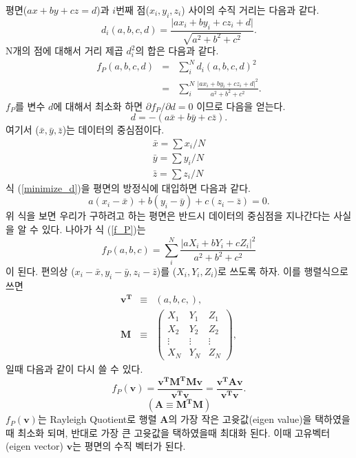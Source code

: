 \documentclass[a4paper,14pt]{oblivoir}
\begin{document}
평면($ax+by+cz=d$)과 $i$번째 점($x_i, y_i, z_i$)  사이의 수직 거리는 다음과 같다.
\begin{equation}
d_i(a,b,c,d) = \frac{\vert ax_i + by_i + cz_i + d \vert}{\sqrt{a^2 + b^2 + c^2}}.
\end{equation}
N개의 점에 대해서 거리 제곱 $d_i^2$의 합은 다음과 같다.
\begin{eqnarray} \label{f_P}
f_P(a,b,c,d) &=& \sum_i^N d_i(a,b,c,d)^2 \\\nonumber
           &=& \sum_i^N \frac{\vert ax_i + by_i + cz_i + d \vert^2}{a^2 + b^2 + c^2}.
\end{eqnarray}
$f_P$를 변수 $d$에 대해서 최소화 하면 ${\partial f_P}/{\partial d} = 0$ 이므로 다음을 얻는다.
\begin{equation} \label{minimize_d}
d = -(a\bar{x} + b\bar{y} + c\bar{z}).
\end{equation}
여기서 ($\bar{x}, \bar{y}, \bar{z}$)는 데이터의 중심점이다. 
\begin{equation} \label{centroid}
\left.
\begin{array}{ll}
\bar{x} = \sum x_i /N \\
\bar{y} = \sum y_i /N \\
\bar{z} = \sum z_i /N
\end{array}\right.
\end{equation}
식 (\ref{minimize_d})을 평면의 방정식에 대입하면 다음과 같다.
\begin{equation}
a(x_i-\bar{x}) + b(y_i-\bar{y}) + c(z_i-\bar{z}) = 0.
\end{equation}
위 식을 보면 우리가 구하려고 하는 평면은 반드시 데이터의 중심점을 지나간다는 사실을 알 수 있다.
나아가 식 (\ref{f_P})는
\begin{equation} \label{f_P2}
f_P(a,b,c) = \sum_i^N \frac{\vert aX_i + bY_i + cZ_i \vert^2}{a^2 + b^2 + c^2}
\end{equation}
이 된다.  편의상 ($x_i-\bar{x}, y_i-\bar{y}, z_i-\bar{z}$)를 ($X_i, Y_i, Z_i$)로 쓰도록 하자.
이를 행렬식으로 쓰면
\begin{eqnarray}
\mathbf{v^T} &\equiv& (a,b,c,), \\
\mathbf{M}   &\equiv& \left( \begin{array}{ccc}
  X_1 & Y_1 & Z_1 \\
  X_2 & Y_2 & Z_2 \\
  \vdots & \vdots & \vdots \\
  X_N & Y_N & Z_N 
\end{array} \right),
\end{eqnarray}
일때 다음과 같이 다시 쓸 수 있다.
\begin{equation}
f_P(\mathbf v) = \frac{\mathbf{v^T}\mathbf{M^T}\mathbf{M}\mathbf{v}}{\mathbf{v^T}\mathbf{v}}
             = \frac{\mathbf{v^T}\mathbf{A}\mathbf{v}}{\mathbf{v^T}\mathbf{v}}.
\end{equation}
\begin{equation}
(\mathbf{A}\equiv\mathbf{M^T}\mathbf{M})
\end{equation}
$f_P(\mathbf{v})$는 Rayleigh Quotient로 행렬 $\mathbf{A}$의 
가장 작은 고윳값(eigen value)을 택하였을때 최소화 되며, 반대로 가장 큰 고윳값을 택하였을때 최대화 된다.
이때 고유벡터(eigen vector) $\mathbf v$는 평면의 수직 벡터가 된다.
\end{document}
